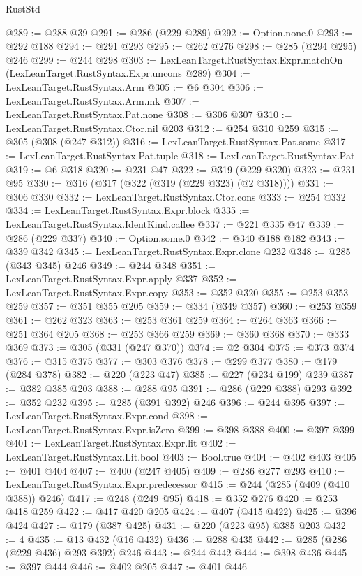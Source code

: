 \begin{lexlean}{RustStd}
\begin{coremodule}
@289 := @288 @39
@291 := @286 (@229 @289)
@292 := Option.none.{0}
@293 := @292 @188
@294 := @291 @293
@295 := @262 @276
@298 := @285 (@294 @295) @246
@299 := @244 @298
@303 := LexLeanTarget.RustSyntax.Expr.matchOn (LexLeanTarget.RustSyntax.Expr.uncons @289)
@304 := LexLeanTarget.RustSyntax.Arm
@305 := @6 @304
@306 := LexLeanTarget.RustSyntax.Arm.mk
@307 := LexLeanTarget.RustSyntax.Pat.none
@308 := @306 @307
@310 := LexLeanTarget.RustSyntax.Ctor.nil @203
@312 := @254 @310 @259
@315 := @305 (@308 (@247 @312))
@316 := LexLeanTarget.RustSyntax.Pat.some
@317 := LexLeanTarget.RustSyntax.Pat.tuple
@318 := LexLeanTarget.RustSyntax.Pat
@319 := @6 @318
@320 := @231 @47
@322 := @319 (@229 @320)
@323 := @231 @95
@330 := @316 (@317 (@322 (@319 (@229 @323) (@2 @318))))
@331 := @306 @330
@332 := LexLeanTarget.RustSyntax.Ctor.cons
@333 := @254 @332
@334 := LexLeanTarget.RustSyntax.Expr.block
@335 := LexLeanTarget.RustSyntax.IdentKind.callee
@337 := @221 @335 @47
@339 := @286 (@229 @337)
@340 := Option.some.{0}
@342 := @340 @188 @182
@343 := @339 @342
@345 := LexLeanTarget.RustSyntax.Expr.clone @232
@348 := @285 (@343 @345) @246
@349 := @244 @348
@351 := LexLeanTarget.RustSyntax.Expr.apply @337
@352 := LexLeanTarget.RustSyntax.Expr.copy
@353 := @352 @320
@355 := @253 @353 @259
@357 := @351 @355 @205
@359 := @334 (@349 @357)
@360 := @253 @359
@361 := @262 @323
@363 := @253 @361 @259
@364 := @264 @363
@366 := @251 @364 @205
@368 := @253 @366 @259
@369 := @360 @368
@370 := @333 @369
@373 := @305 (@331 (@247 @370))
@374 := @2 @304
@375 := @373 @374
@376 := @315 @375
@377 := @303 @376
@378 := @299 @377
@380 := @179 (@284 @378)
@382 := @220 (@223 @47)
@385 := @227 (@234 @199) @239
@387 := @382 @385 @203
@388 := @288 @95
@391 := @286 (@229 @388) @293
@392 := @352 @232
@395 := @285 (@391 @392) @246
@396 := @244 @395
@397 := LexLeanTarget.RustSyntax.Expr.cond
@398 := LexLeanTarget.RustSyntax.Expr.isZero
@399 := @398 @388
@400 := @397 @399
@401 := LexLeanTarget.RustSyntax.Expr.lit
@402 := LexLeanTarget.RustSyntax.Lit.bool
@403 := Bool.true
@404 := @402 @403
@405 := @401 @404
@407 := @400 (@247 @405)
@409 := @286 @277 @293
@410 := LexLeanTarget.RustSyntax.Expr.predecessor
@415 := @244 (@285 (@409 (@410 @388)) @246)
@417 := @248 (@249 @95)
@418 := @352 @276
@420 := @253 @418 @259
@422 := @417 @420 @205
@424 := @407 (@415 @422)
@425 := @396 @424
@427 := @179 (@387 @425)
@431 := @220 (@223 @95) @385 @203
@432 := 4
@435 := @13 @432 (@16 @432)
@436 := @288 @435
@442 := @285 (@286 (@229 @436) @293 @392) @246
@443 := @244 @442
@444 := @398 @436
@445 := @397 @444
@446 := @402 @205
@447 := @401 @446

\end{coremodule}
\end{lexlean}
